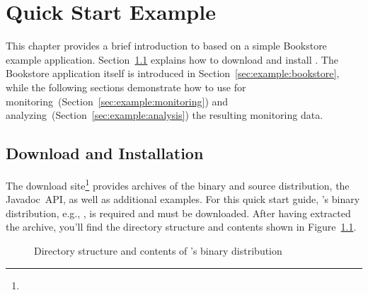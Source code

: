 %


\chapter{Quick Start Example}\label{chap:example}

This chapter provides a brief introduction to \Kieker{} based on a simple Bookstore example application. Section~\ref{sec:example:downloadInstall} explains how to download and install \Kieker{}. The Bookstore application itself is introduced in Section~\ref{sec:example:bookstore}, while the following sections demonstrate how to use \Kieker{} for monitoring~(Section~\ref{sec:example:monitoring}) and analyzing~(Section~\ref{sec:example:analysis}) the resulting monitoring data.

\section{Download and Installation}\label{sec:example:downloadInstall}

The \Kieker{} download site\footnote{\KiekerDownloadURL{}} provides archives of the binary and source distribution, the Javadoc~API, as well as additional examples. For this quick start guide, \Kieker{}'s binary distribution, e.g., \file{\binaryFileForDownload}, is required and must be downloaded. After having extracted the archive, you'll find the directory structure and contents shown in Figure~\ref{fig:binary-layout}.

\enlargethispage{0.8cm}

\begin{figure}[h!]%
\begin{graybox}
\end{graybox}
\caption{Directory structure and contents of \Kieker{}'s binary distribution}
\label{fig:binary-layout}
\end{figure}

